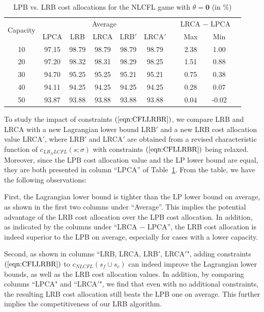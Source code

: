 \documentclass[ijoc,nonblindrev]{informs3} %
\begin{document}
\begin{table}[H]
\vspace{-2mm}
\centering
\tabcolsep=14pt
\small
\renewcommand\arraystretch{1.5}
\caption{\label{table:LRBLPBSG}LPB vs. LRB cost allocations for the NLCFL game with $\theta = \textbf{0}$ (in \%)}
\begin{tabular}[!h]{c c c c c c c c c c}
\hline
\multirow{2}{*}{Capacity} & \multicolumn{5}{c}{Average}	&\multicolumn{1}{c}{} & \multicolumn{2}{c}{LRCA $-$ LPCA}\\
\cline{2-6}
\cline{8-9}
& LPCA & LRB & LRCA	& LRB$'$ & LRCA$'$	& &Max	&Min\\
\hline
10    &97.15	&98.79	&98.79	&98.79	&98.79	&	&2.38	&1.00\\

20    &97.20	&98.32	&98.31	&98.29	&98.25	&	&1.51	&0.88\\

30    &94.70	&95.25	&95.25	&95.21	&95.21	&	&0.75	&0.38\\

40    &94.11	&94.25	&94.25	&94.25	&94.25	&	&0.28	&0.07\\

50    &93.87	&93.88	&93.88	&93.88	&93.88	&	&0.04	&-0.02\\
\hline
\end{tabular}
\vspace{-3mm}
\end{table}
To study the impact of constraints $(\ref{eqn:CFLLRBR})$, we compare LRB and LRCA with a new Lagrangian lower bound LRB$'$ and a new LRB cost allocation value LRCA$'$, where LRB$'$ and LRCA$'$ are obtained from a revised characteristic function of $c_{LR_NLCFL}(s;\sigma)$ with constraints $(\ref{eqn:CFLLRBR})$ being relaxed. Moreover,
since the LPB cost allocation value and the LP lower bound are equal, they are both presented in column ``LPCA'' of Table~\ref{table:LRBLPBSG}.
From the table, we have the following observations:

First, the Lagrangian lower bound is tighter than the LP lower bound on average, as shown in the first two columns under ``Average''.
This implies the potential advantage of the LRB cost allocation over the LPB cost allocation.
In addition, as indicated by the columns under ``LRCA $-$ LPCA'', the LRB cost allocation is indeed superior to the LPB on average, especially for cases with a lower capacity.

Second, as shown in columns ``LRB, LRCA, LRB$'$, LRCA$'$", adding constraints $(\ref{eqn:CFLLRBR})$ to $c_{NLCFL}(s_f \cup s_c)$ can indeed improve the Lagrangian lower bounds, as well as the LRB cost allocation values. In addition, by comparing columns ``LPCA" and ``LRCA$'$", we find that even with no additional constraints, the resulting LRB cost allocation still beats the LPB one on average. This further implies the competitiveness of our LRB algorithm.
\end{document}
